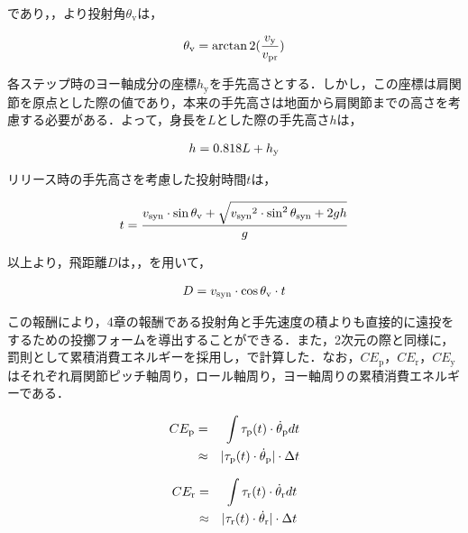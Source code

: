であり，，より投射角$\theta_{\mathrm{v}}$は，

\begin{eqnarray}
  \equlabel{5.3}
  \theta_{\mathrm{v}} = \arctan2(\frac{v_{\mathrm{y}}}{v_{\mathrm{pr}}})
\end{eqnarray}

各ステップ時のヨー軸成分の座標$h_{\mathrm{y}}$を手先高さとする．しかし，この座標は肩関節を原点とした際の値であり，本来の手先高さは地面から肩関節までの高さを考慮する必要がある．よって，身長を$L$とした際の手先高さ$h$は，

\begin{eqnarray}
  \equlabel{5.4}
  h = 0.818L + h_{\mathrm{y}}
\end{eqnarray}

リリース時の手先高さを考慮した投射時間$t$は，

\begin{eqnarray}
  \equlabel{5.5}
  t = \frac{v_{\mathrm{syn}} \cdot \sin\theta_{\mathrm{v}} + \sqrt{{v_{\mathrm{syn}}}^2 \cdot \sin^2\theta_{\mathrm{syn}} + 2gh}}{g}
\end{eqnarray}


以上より，飛距離$D$は，，を用いて，

\begin{eqnarray}
  \equlabel{5.6}
  D = v_{\mathrm{syn}} \cdot \cos\theta_{\mathrm{v}} \cdot t
\end{eqnarray}

この報酬により，4章の報酬である投射角と手先速度の積よりも直接的に遠投をするための投擲フォームを導出することができる．また，2次元の際と同様に，罰則として累積消費エネルギーを採用し，で計算した．なお，$CE_{\mathrm{p}}，CE_{\mathrm{r}}，CE_{\mathrm{y}}$はそれぞれ肩関節ピッチ軸周り，ロール軸周り，ヨー軸周りの累積消費エネルギーである．

\begin{eqnarray}
  \equlabel{5.7}
  CE_{\mathrm{p}}&=&\int \tau_{\mathrm{p}}(t)\cdot\dot{\theta}_{\mathrm{p}} dt\\
        &\approx&|\tau_{\mathrm{p}}(t)\cdot\dot{\theta}_{\mathrm{p}}|\cdot\Delta t
\end{eqnarray}

\begin{eqnarray}
  \equlabel{5.8}
  CE_{\mathrm{r}}&=&\int \tau_{\mathrm{r}}(t)\cdot\dot{\theta}_{\mathrm{r}} dt\\
        &\approx&|\tau_{\mathrm{r}}(t)\cdot\dot{\theta}_{\mathrm{r}}|\cdot\Delta t
\end{eqnarray}

